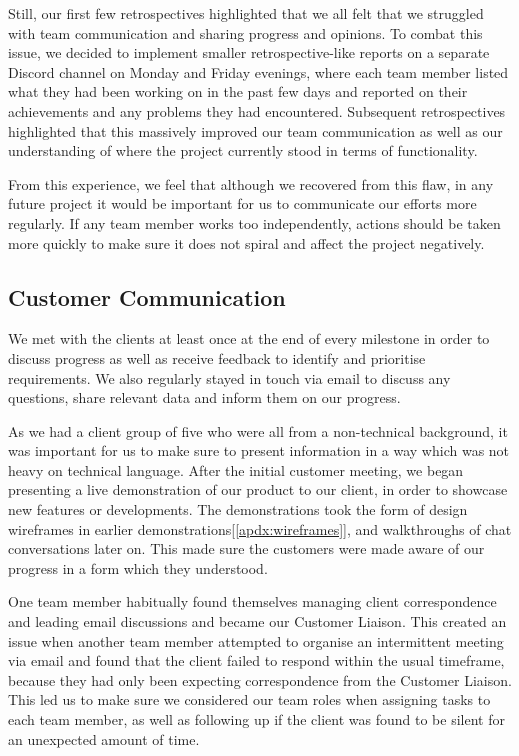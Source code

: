 \documentclass{l3proj}
\begin{document}
Still, our first few retrospectives highlighted that we all felt that we struggled with team communication and sharing progress and opinions. To combat this issue, we decided to implement smaller retrospective-like reports on a separate Discord channel on Monday and Friday evenings, where each team member listed what they had been working on in the past few days and reported on their achievements and any problems they had encountered. Subsequent retrospectives highlighted that this massively improved our team communication as well as our understanding of where the project currently stood in terms of functionality.

From this experience, we feel that although we recovered from this flaw, in any future project it would be important for us to communicate our efforts more regularly. If any team member works too independently, actions should be taken more quickly to make sure it does not spiral and affect the project negatively.

\subsection{Customer Communication}
\label{subsec:customer_com}

We met with the clients at least once at the end of every milestone in order to discuss progress as well as receive feedback to identify and prioritise requirements. We also regularly stayed in touch via email to discuss any questions, share relevant data and inform them on our progress.

As we had a client group of five who were all from a non-technical background, it was important for us to make sure to present information in a way which was not heavy on technical language. After the initial customer meeting, we began presenting a live demonstration of our product to our client, in order to showcase new features or developments. The demonstrations took the form of design wireframes in earlier demonstrations[\ref{apdx:wireframes}], and walkthroughs of chat conversations later on. This made sure the customers were made aware of our progress in a form which they understood.

One team member habitually found themselves managing client correspondence and leading email discussions and became our Customer Liaison. This created an issue when another team member attempted to organise an intermittent meeting via email and found that the client failed to respond within the usual timeframe, because they had only been expecting correspondence from the Customer Liaison. This led us to make sure we considered our team roles when assigning tasks to each team member, as well as following up if the client was found to be silent for an unexpected amount of time.
\end{document}
